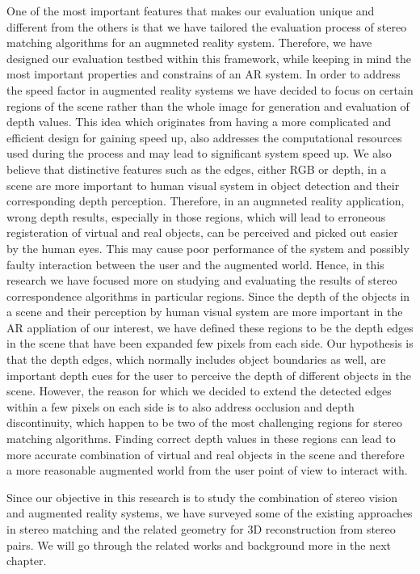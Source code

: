 \documentclass[dvips,letterpaper,12pt]{report}
\begin{document}
One of the most important features that makes our evaluation unique and different from the others is that we have tailored the evaluation process of stereo matching algorithms for an augmneted 
reality system. Therefore, we have designed our evaluation testbed within this framework, while keeping in mind the most important properties and constrains of an AR system.
In order to address the speed factor in augmented reality systems we have decided to focus on certain regions of the scene rather than the whole image for generation and evaluation of 
depth values. 
This idea which originates from having a more complicated and efficient design for gaining speed up, 
also addresses the computational resources used during the process and may lead to significant system speed up.
We also believe that distinctive features such as the edges, either RGB or depth, in a scene are more important to human visual system in object detection and their corresponding depth perception. 
Therefore, in an augmneted reality application, wrong depth results, especially in those regions, which will lead to erroneous registeration of virtual and real objects, 
can be perceived and picked out easier by the human eyes. This may cause poor performance of the system and possibly faulty interaction between 
the user and the augmented world. 
Hence, in this research we have focused more on studying and evaluating the results of stereo correspondence algorithms in particular regions. Since the depth of the objects 
in a scene and their perception by human visual system are more important in the AR appliation of our interest, we have 
defined these regions to be the depth edges in the scene that have been expanded few pixels from each side. 
Our hypothesis is that the depth edges, which normally includes object boundaries as well, are important depth cues for the user to perceive the depth of different objects in the scene. 
However, the reason for which we decided to extend the detected edges within a few pixels on each side is to also address occlusion and depth discontinuity, which happen to be two of
the most challenging regions for stereo matching algorithms.
Finding correct depth values in these 
regions can lead to more accurate combination of virtual and real objects in the scene and therefore a more reasonable augmented world from the user point of view to interact with. \newline
\newline

Since our objective in this research is to study the combination of stereo vision and augmented reality systems, we have surveyed some of the existing approaches in stereo matching and the
related geometry for 3D reconstruction from stereo pairs. We will go through the related works and background more in the next chapter. 
\end{document}
